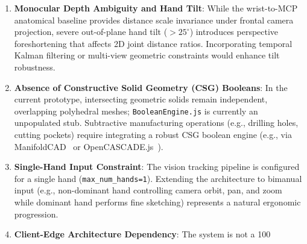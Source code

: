 \begin{enumerate}
    \item \textbf{Monocular Depth Ambiguity and Hand Tilt}: While the wrist-to-MCP anatomical baseline provides distance scale invariance under frontal camera projection, severe out-of-plane hand tilt ($> 25^\circ$) introduces perspective foreshortening that affects 2D joint distance ratios. Incorporating temporal Kalman filtering or multi-view geometric constraints would enhance tilt robustness.
    \item \textbf{Absence of Constructive Solid Geometry (CSG) Booleans}: In the current prototype, intersecting geometric solids remain independent, overlapping polyhedral meshes; \texttt{BooleanEngine.js} is currently an unpopulated stub. Subtractive manufacturing operations (e.g., drilling holes, cutting pockets) require integrating a robust CSG boolean engine (e.g., via ManifoldCAD~\cite{manifoldcad} or OpenCASCADE.js~\cite{opencascadejs}).
    \item \textbf{Single-Hand Input Constraint}: The vision tracking pipeline is configured for a single hand (\texttt{max\_num\_hands=1}). Extending the architecture to bimanual input (e.g., non-dominant hand controlling camera orbit, pan, and zoom while dominant hand performs fine sketching) represents a natural ergonomic progression.
    \item \textbf{Client-Edge Architecture Dependency}: The system is not a 100%
\end{enumerate}
